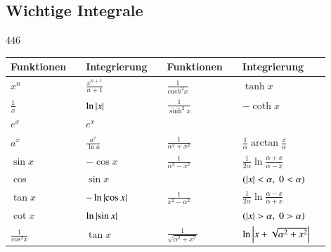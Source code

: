 \subsection{Wichtige Integrale}{446}

\begin{tabular}{|ll|ll||ll|ll|}
    \hline
    Funktionen                                 && Integrierung                             && Funktionen                                 && Integrierung                                                    &\\
    \hline
    $ x^n$                                     && $ \frac{x^{n+1}}{n+1} $                  && $ \frac{1}{cosh^2 x} $                     && $ \tanh x $                                                     &\\
    $ \frac{1}{x} $                            && $ \ln \left|x\right| $                          && $ \frac{1}{\sinh^2 x}$                     && $ -\coth x $                                                    &\\
    $ e^x $                                    && $ e^x $                                  &&                                            &&                                                                 &\\
    $ a^x $                                    && $ \frac{a^x}{\ln a} $                    && $ \frac{1}{\alpha^2 + x^2}$                && $ \frac{1}{\alpha} \arctan \frac{x}{\alpha} $                   &\\
    $ \sin x $                                 && $ -\cos x $                              && $ \frac{1}{\alpha^2 - x^2}$                && $ \frac{1}{2\alpha} \ln \frac{\alpha + x}{\alpha - x} $         &\\
    $ \cos $                                   && $ \sin x $                               &&                                            && $ (\left|x\right| < \alpha, \; 0 < \alpha)$                            &\\
    $ \tan x $                                 && $ -\ln \left|\cos x\right| $                    && $ \frac{1}{x^2 - \alpha^2}$                && $ \frac{1}{2\alpha} \ln \frac{\alpha - x}{\alpha + x} $         &\\
    $ \cot x $                                 && $ \ln \left|\sin x\right|$                      &&                                            && $ (\left|x\right| > \alpha, \; 0 > \alpha)$                            &\\
    $ \frac{1}{cos^2 x} $                      && $ \tan x $                               && $ \frac{1}{\sqrt{\alpha^2 + x^2}}$         && $ \ln \left|x + \sqrt{\alpha^2 + x^2}\right|$                          &\\

\end{tabular}
